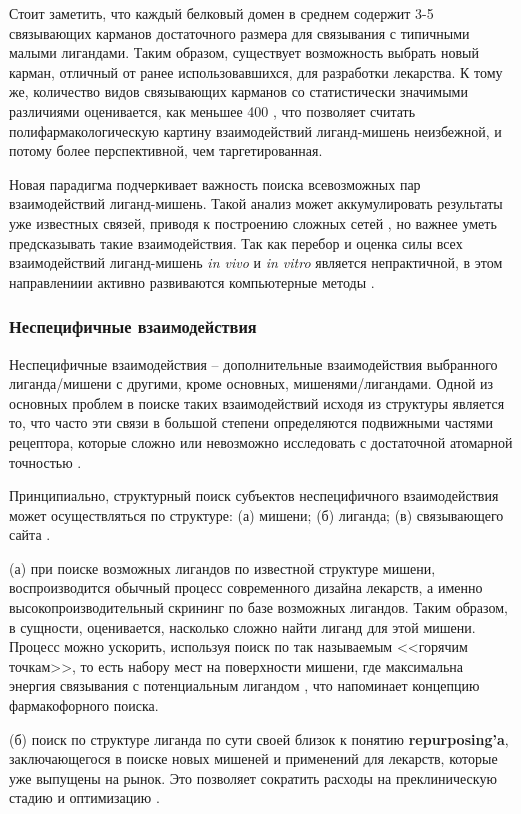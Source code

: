 \documentclass[a4paper,14pt]{article}         %
\begin{document}
Стоит заметить, что каждый белковый домен в среднем содержит 3-5 связывающих карманов достаточного размера для связывания с типичными малыми лигандами\cite{Skolnick2015}. Таким образом, существует возможность выбрать новый карман, отличный от ранее использовавшихся, для разработки лекарства. К тому же, количество видов связывающих карманов со статистически значимыми различиями оценивается, как меньшее 400 \cite{Skolnick2015}, что позволяет считать полифармакологическую картину взаимодействий лиганд-мишень неизбежной, и потому более перспективной, чем таргетированная.

Новая парадигма подчеркивает важность поиска всевозможных пар взаимодействий лиганд-мишень. Такой анализ может аккумулировать результаты уже известных связей, приводя к построению сложных сетей \cite{Anighoro2014}, но важнее уметь предсказывать такие взаимодействия. Так как перебор и оценка силы всех взаимодействий лиганд-мишень \textit{in vivo} и \textit{in vitro} является непрактичной, в этом направлениии активно развиваются компьютерные методы \cite{Chaudhari}.

\subsubsection{Неспецифичные взаимодействия}
Неспецифичные взаимодействия -- дополнительные взаимодействия выбранного лиганда/мишени с другими, кроме основных, {мишенями/лигандами}. Одной из основных проблем в поиске таких взаимодействий исходя из структуры является то, что часто эти связи в большой степени определяются подвижными частями рецептора, которые сложно или невозможно исследовать с достаточной атомарной точностью \cite{Loving}.

Принципиально, структурный поиск субъектов неспецифичного взаимодействия может осуществляться по структуре: (а) мишени; (б) лиганда; (в) связывающего сайта \cite{Rognan2010}.

(а) при поиске возможных лигандов по известной структуре мишени, воспроизводится обычный процесс современного дизайна лекарств, а именно высокопроизводительный скрининг по базе возможных лигандов. Таким образом, в сущности, оценивается, насколько сложно найти лиганд для этой мишени. Процесс можно ускорить, используя поиск по так называемым <<горячим точкам>>, то есть набору мест на поверхности мишени, где максимальна энергия связывания с потенциальным лигандом \cite{Hall2015}, что напоминает концепцию фармакофорного поиска.

(б) поиск по структуре лиганда по сути своей близок к понятию \linebreak \textbf{repurposing'a}, заключающегося в поиске новых мишеней и применений для лекарств, которые уже выпущены на рынок. Это позволяет сократить расходы на преклиническую стадию и оптимизацию \cite{Hall2015, March-Vila2017}.
\end{document}
